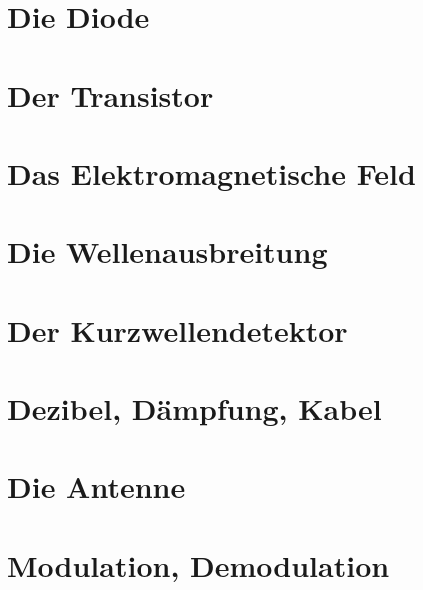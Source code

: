 \documentclass[ngerman, openany, twoside]{texdata/Script}
\begin{document}
\chapter{Die Diode}


\chapter{Der Transistor}


\newpage \vspace*{5cm}
\newpage

\chapter{Das Elektromagnetische Feld}


\newpage \vspace*{5cm}
\newpage

\chapter{Die Wellenausbreitung}


\chapter{Der Kurzwellendetektor}


\chapter{Dezibel, Dämpfung, Kabel}


\newpage \vspace*{5cm}
\newpage

\chapter{Die Antenne}


\newpage \vspace*{5cm}
\newpage

\chapter{Modulation, Demodulation}


\newpage \vspace*{5cm}
\newpage
\end{document}
